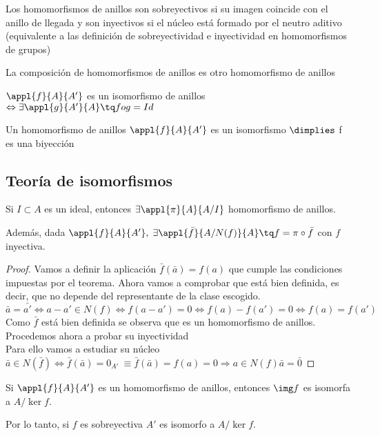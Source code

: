 \documentclass[nochap]{apuntes}
\begin{document}
Los homomorfismos de anillos son sobreyectivos si su imagen coincide con el anillo de llegada y son inyectivos si el núcleo está
formado por el neutro aditivo (equivalente a las definición de sobreyectividad e inyectividad en homomorfismos de grupos)

\begin{lemma}
 La composición de homomorfismos de anillos es otro homomorfismo de anillos
\end{lemma}

\begin{defn}
 $\appl{f}{A}{A'}$  es un isomorfismo de anillos $\Leftrightarrow \exists \appl{g}{A'}{A} \tq fog = Id$
\end{defn}

\begin{lemma}
 Un homomorfismo de anillos $\appl{f}{A}{A'}$  es un isomorfismo $\dimplies$ f es una biyección
\end{lemma}

\subsection{Teoría de isomorfismos}
\begin{theorem}
Si $I \subset A$  es un ideal, entonces $\exists \appl{\pi}{A}{A/I}$ homomorfismo de anillos.

Además, dada  $\appl{f}{A}{A'},\; \exists \appl{\bar{f}}{A/N(f)}{A} \tq f=\pi \circ \bar{f}$ con $f$ inyectiva.
\end{theorem}
\begin{proof}
 Vamos a definir la aplicación $\bar{f}(\bar{a})=f(a)$  que cumple las condiciones impuestas por el teorema.
 Ahora vamos a comprobar que está bien definida, es decir, que no depende del representante de la clase escogido.\\
 $\bar{a}=\bar{a'} \Leftrightarrow a-a'\in N(f) \Leftrightarrow f(a-a')=0 \Leftrightarrow f(a)-f(a')=0 \Leftrightarrow f(a)=f(a')$\\
 Como $\bar{f}$  está bien definida se observa que es un homomorfismo de anillos. Procedemos ahora a probar su inyectividad\\
 Para ello vamos a estudiar su núcleo\\
 $\bar{a}\in N(\bar{f}) \Leftrightarrow \bar{f}(\bar{a})=0_{A'} \ \equiv \bar{f}(\bar{a})=f(a)=0 \Rightarrow a \in N(f) \bar{a}=\bar{0}$
\end{proof}

\begin{theorem} \label{thmIsoAnillos2}
 Si  $\appl{f}{A}{A'}$  es un homomorfismo de anillos, entonces $\img f$ es isomorfa a $A/\ker f$.

 Por lo tanto, si $f$ es sobreyectiva $A'$ es isomorfo a $A/\ker f$.
\end{theorem}
\end{document}
